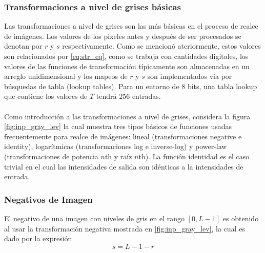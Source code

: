		\subsubsection{Transformaciones a nivel de grises básicas}
		Las transformaciones a nivel de grises son las más básicas en el proceso de realce de imágenes. Los valores de los pixeles antes y después de ser procesados se denotan por $r$ y $s$ respectivamente. Como se mencionó ateriormente, estos valores son relacionados por \ref{eq:str_eq}, como se trabaja con cantidades digitales, los valores de las funciones de transformación típicamente son almacenadas en un arreglo unidimensional y los mapeos de $r$ y $s$ son implementados via por búsquedas de tabla (lookup tables). Para un entorno de 8 bits, una tabla lookup que contiene los valores de $T$ tendrá 256 entradas.
		\\\\
		Como introducción a las transformaciones a nivel de grises, considera la figura \ref{fig:inp_gray_lev} la cual muestra tres tipos básicos de funciones usadas frecuentemente para realce de imágenes: lineal (transformaciones negative e identity), logarítmicas (transformaciones log e inverse-log) y power-law (transformaciones de potencia $n$th y raíz $n$th). La función identidad es el caso trivial en el cual las intensidades de salida son idénticas a la intensidades de entrada.
		
		\subsubsection{Negativos de Imagen}
		El negativo de una imagen con niveles de gris en el rango $[0, L-1]$ es obtenido al usar la transformación negativa mostrada en \ref{fig:inp_gray_lev}, la cual es dado por la expresión
		\begin{equation}
			s = L - 1 - r 
		\end{equation}
		
